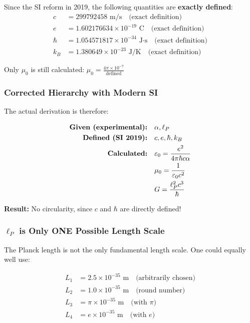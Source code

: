 \documentclass[12pt,a4paper]{article}
\theoremstyle{definition}
\begin{document}
	\begin{tcolorbox}[colback=green!5!white,colframe=green!75!black,title=Modern SI Base]
		Since the SI reform in 2019, the following quantities are \textbf{exactly defined}:
		\begin{align}
			c &= 299792458 \text{ m/s} \quad \text{(exact definition)}\\
			e &= 1.602176634 \times 10^{-19} \text{ C} \quad \text{(exact definition)}\\
			\hbar &= 1.054571817 \times 10^{-34} \text{ J·s} \quad \text{(exact definition)}\\
			k_B &= 1.380649 \times 10^{-23} \text{ J/K} \quad \text{(exact definition)}
		\end{align}
		
		Only $\mu_0$ is still calculated: $\mu_0 = \frac{4\pi \times 10^{-7}}{\text{defined}}$
	\end{tcolorbox}
	
	\subsubsection{Corrected Hierarchy with Modern SI}
	
	The actual derivation is therefore:
	
	\begin{align}
		\text{\textbf{Given (experimental):}} &\quad \alpha, \ell_P\\
		\text{\textbf{Defined (SI 2019):}} &\quad c, e, \hbar, k_B\\
		\text{\textbf{Calculated:}} &\quad \varepsilon_0 = \frac{e^2}{4\pi\hbar c \alpha}\\
		&\quad \mu_0 = \frac{1}{\varepsilon_0 c^2}\\
		&\quad G = \frac{\ell_P^2 c^3}{\hbar}
	\end{align}
	
	\textbf{Result:} No circularity, since $c$ and $\hbar$ are directly defined!
	
	\subsubsection{$\ell_P$ is Only ONE Possible Length Scale}
	
	The Planck length is not the only fundamental length scale. One could equally well use:
	
	\begin{align}
		L_1 &= 2.5 \times 10^{-35} \text{ m} \quad \text{(arbitrarily chosen)}\\
		L_2 &= 1.0 \times 10^{-35} \text{ m} \quad \text{(round number)}\\
		L_3 &= \pi \times 10^{-35} \text{ m} \quad \text{(with } \pi \text{)}\\
		L_4 &= e \times 10^{-35} \text{ m} \quad \text{(with } e \text{)}
	\end{align}
	
\end{document}
